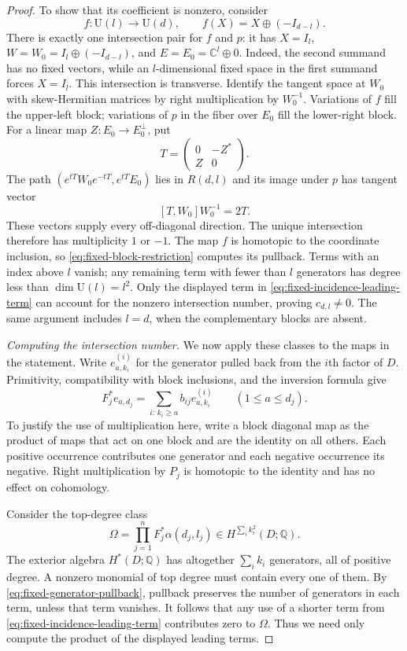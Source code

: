 \begin{proof}
To show that its coefficient is nonzero, consider
\[
 f:\mathrm U(l)\longrightarrow\mathrm U(d),
 \qquad f(X)=X\oplus(-I_{d-l}).
\]
There is exactly one intersection pair for $f$ and $p$: it has
$X=I_l$, $W=W_0=I_l\oplus(-I_{d-l})$, and $E=E_0=\mathbb C^l\oplus0$.
Indeed, the second summand has no fixed vectors, while an $l$-dimensional
fixed space in the first summand forces $X=I_l$.  This intersection is
transverse.  Identify the tangent space at $W_0$ with skew-Hermitian
matrices by right multiplication by $W_0^{-1}$.  Variations of $f$ fill
the upper-left block; variations of $p$ in the fiber over $E_0$ fill
the lower-right block.  For a linear map $Z:E_0\to E_0^\perp$, put
\[
 T=\begin{pmatrix}0&-Z^*\\ Z&0\end{pmatrix}.
\]
The path $(e^{tT}W_0e^{-tT},e^{tT}E_0)$ lies in $R(d,l)$ and its image
under $p$ has tangent vector
\[
 [T,W_0]W_0^{-1}=2T.
\]
These vectors supply every off-diagonal direction.  The unique
intersection therefore has multiplicity $1$ or $-1$.  The map $f$ is
homotopic to the coordinate inclusion, so
\eqref{eq:fixed-block-restriction} computes its pullback.  Terms with
an index above $l$ vanish; any remaining term with fewer than $l$
generators has degree less than $\dim\mathrm U(l)=l^2$.  Only the
displayed term in \eqref{eq:fixed-incidence-leading-term} can account for
the nonzero intersection number, proving $c_{d,l}\ne0$.
The same argument includes $l=d$, when the complementary blocks are
absent.

\smallskip\noindent
\emph{Computing the intersection number.}
We now apply these classes to the maps in the statement.  Write
$e_{a,k_i}^{(i)}$ for the generator pulled back from the $i$th factor of
$D$.  Primitivity, compatibility with block inclusions, and the inversion
formula give
\begin{equation}\label{eq:fixed-generator-pullback}
 F_j^*e_{a,d_j}
   =\sum_{i:\,k_i\geq a}b_{ij}e_{a,k_i}^{(i)}
       \qquad(1\leq a\leq d_j).
\end{equation}
To justify the use of multiplication here, write a block diagonal map
as the product of maps that act on one block and are the identity on
all others.  Each positive occurrence contributes one generator and
each negative occurrence its negative.  Right multiplication by $P_j$
is homotopic to the identity and has no effect on cohomology.

Consider the top-degree class
\[
 \Omega=\prod_{j=1}^nF_j^*\alpha(d_j,l_j)
       \in H^{\sum_i k_i^2}(D;\mathbb Q).
\]
The exterior algebra $H^*(D;\mathbb Q)$ has altogether $\sum_i k_i$
generators, all of positive degree.  A nonzero monomial of top degree
must contain every one of them.  By
\eqref{eq:fixed-generator-pullback}, pullback preserves the number of
generators in each term, unless that term vanishes.  It follows that
any use of a shorter term from
\eqref{eq:fixed-incidence-leading-term} contributes zero to $\Omega$.
Thus we need only compute the product of the displayed leading terms.


\end{proof}
